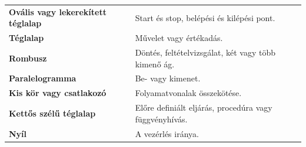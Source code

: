 \begin{tabularx}{\textwidth}{>{\bfseries}lX}
Ovális vagy lekerekített téglalap & Start és stop, belépési és kilépési pont. \\
Téglalap & Művelet vagy értékadás. \\
Rombusz & Döntés, feltételvizsgálat, két vagy több kimenő ág. \\
Paralelogramma & Be- vagy kimenet. \\
Kis kör vagy csatlakozó & Folyamatvonalak összekötése. \\
Kettős szélű téglalap & Előre definiált eljárás, procedúra vagy függvényhívás. \\
Nyíl & A vezérlés iránya. \\
\end{tabularx}
